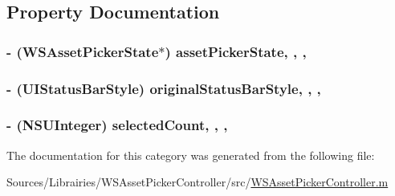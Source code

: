 \subsection{Property Documentation}
\hypertarget{category_w_s_asset_picker_controller_07_08_a7dcc2ce8ed2a142ebb72d4da9fe03beb}{
\subsubsection[{asset\-Picker\-State}]{\setlength{\rightskip}{0pt plus 5cm}-\/ ({\bf W\-S\-Asset\-Picker\-State}$\ast$) asset\-Picker\-State\hspace{0.3cm}{\ttfamily [read]}, {\ttfamily [write]}, {\ttfamily [nonatomic]}, {\ttfamily [strong]}}}\label{category_w_s_asset_picker_controller_07_08_a7dcc2ce8ed2a142ebb72d4da9fe03beb}
\hypertarget{category_w_s_asset_picker_controller_07_08_ab1a01295920a16180141095f1d52d4d5}{
\subsubsection[{original\-Status\-Bar\-Style}]{\setlength{\rightskip}{0pt plus 5cm}-\/ (U\-I\-Status\-Bar\-Style) original\-Status\-Bar\-Style\hspace{0.3cm}{\ttfamily [read]}, {\ttfamily [write]}, {\ttfamily [nonatomic]}, {\ttfamily [assign]}}}\label{category_w_s_asset_picker_controller_07_08_ab1a01295920a16180141095f1d52d4d5}
\hypertarget{category_w_s_asset_picker_controller_07_08_ad410a147b7aa711049fac594ede37760}{
\subsubsection[{selected\-Count}]{\setlength{\rightskip}{0pt plus 5cm}-\/ (N\-S\-U\-Integer) selected\-Count\hspace{0.3cm}{\ttfamily [read]}, {\ttfamily [write]}, {\ttfamily [nonatomic]}, {\ttfamily [assign]}}}\label{category_w_s_asset_picker_controller_07_08_ad410a147b7aa711049fac594ede37760}


The documentation for this category was generated from the following file\-:\begin{DoxyCompactItemize}
\item 
Sources/\-Librairies/\-W\-S\-Asset\-Picker\-Controller/src/\hyperlink{_w_s_asset_picker_controller_8m}{W\-S\-Asset\-Picker\-Controller.\-m}\end{DoxyCompactItemize}
